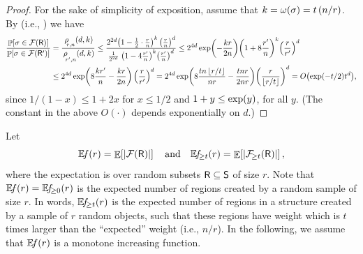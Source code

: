 \begin{proof}
    For the sake of simplicity of exposition, assume that
    $k = \WeightX[]{\Trap} = t\,(n/r)$.  By 
    (i.e., ) we have
    \begin{align*}
      \frac{\Prob{\Trap \in \RegionsSet{\Sample}}}{ \Prob{\Trap \in
      \RegionsSet{\SampleA}}}%
      &=%
        \frac{\CSProbFull{r}{d}{k}{n}} {\CSProbFull{r'}{d}{k}{n}}
          \leq \frac{2^{2d}\pth{ 1 - \frac{1}{2} \cdot \frac{r}{n} }^{k}
          \,\pth{\frac{r}{n}}^d}{%
          \frac{1}{2^{2d}} \; \pth{ 1 - 4 \frac{ r'}{n} }^{k}
          \pth{\frac{r'}{n}}^d}
          \leq%
          2^{4d}\exp \pth{ - \frac{kr}{2n} } \pth{ 1 + 8 \frac{
          r'}{n} }^{k} \pth{\frac{r}{r'}}^d%
      \\&%
      \leq 2^{4d}\exp
      \pth{ 8 \frac{ kr'}{n}- \frac{kr}{2n} }
      \,\pth{\frac{r}{r'}}^d
      = 2^{4d}\exp \pth{ 8 \frac{ tn \floor{r/t}}{nr}-
      \frac{tnr}{2nr} } \pth{\frac{r}{\floor{r/t}}}^d = O
      \pth{ \exp\pth{-t/2} t^d },
    \end{align*}
    since $1/(1-x) \leq 1+2x$ for $x \leq 1 /2$ and $1+y \leq \exp
    \pth{y}$, for all $y$. (The constant in the above $O(\cdot)$
    depends exponentially on $d$.)
\end{proof}

Let
\begin{equation*}
    \NumOfRegionsZero{r} = \Ex{
       \cardin{\MakesBig\RegionsSet{\Sample}}}%
    \quad \text{and}\quad%
    \NumOfRegions{t}{r} = \Ex{
       \cardin{\RegionsHeavy{t}{\Sample}}},
\end{equation*}
where the expectation is over random subsets $\mathsf{R} \subseteq
\mathsf{S}$ of size $r$. Note that $\NumOfRegionsZero{r} =
\NumOfRegions{0}{r}$ is the expected number of regions created by a
random sample of size $r$. In words, $\NumOfRegions{t}{r}$ is the
expected number of regions in a structure created by a sample of $r$
random objects, such that these regions have weight which is $t$ times
larger than the ``expected'' weight (i.e., $n/r$).  In the following,
we assume that $\NumOfRegionsZero{r}$ is a monotone increasing
function.

